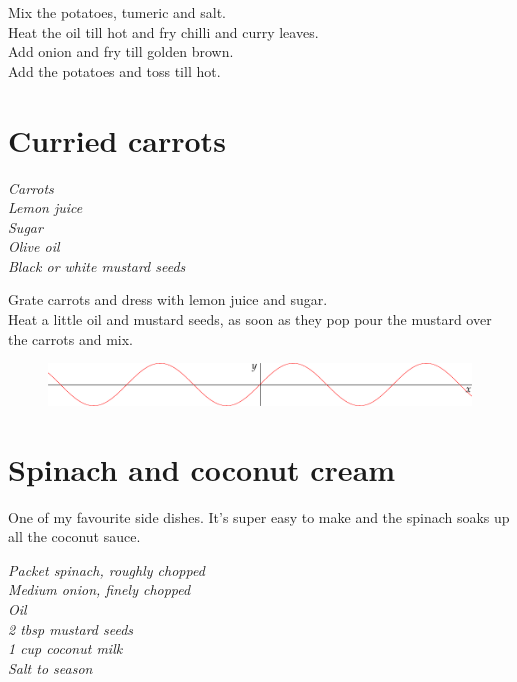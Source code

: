 \documentclass{tufte-book}
\begin{document}
\smallskip
Mix the potatoes, tumeric and salt.
\\Heat the oil till hot and fry chilli and curry leaves.
\\Add onion and fry till golden brown.
\\Add the potatoes and toss till hot.


\section{Curried carrots}
\emph{Carrots
\\Lemon juice
\\Sugar
\\Olive oil
\\Black or white mustard seeds
}

\smallskip
Grate carrots and dress with lemon juice and sugar.
\\Heat a little oil and mustard seeds, as soon as they pop pour the mustard over the carrots and mix.

\begin{figure}[h]
  \includegraphics[width=\linewidth]{sine.pdf}%
\end{figure}



\section{Spinach and coconut cream}

One of my favourite side dishes. It's super easy to make and the spinach soaks up all the coconut sauce.

\smallskip
\emph{Packet spinach, roughly chopped
\\Medium onion, finely chopped
\\Oil
\\2 tbsp mustard seeds
\\1 cup coconut milk
\\Salt to season
}
\end{document}
